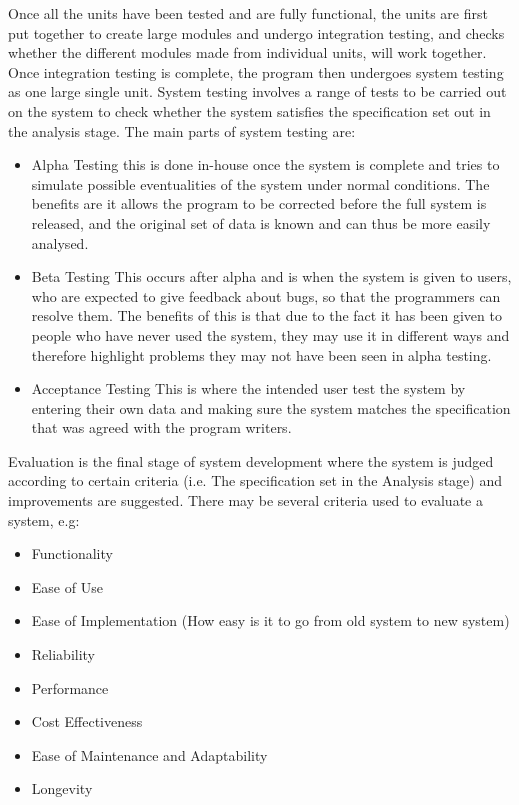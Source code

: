   Once all the units have been tested and are fully functional, the units are first put together to create large modules and  undergo integration testing, and checks whether the different modules made from individual units, will work together. Once integration testing is complete, the program then undergoes system testing as one large single unit. System testing involves a range of tests to be carried out on the system to check whether the system satisfies the specification set out in the analysis stage. The main parts of system testing are:
  \begin{itemize}
    \setlength\itemsep{0em}
    \item Alpha Testing
      \subitem this is done in-house once the system is complete and tries to simulate possible eventualities of the system under normal conditions. The benefits are it allows the program to be corrected before the full system is released, and the original set of data is known and can thus be more easily analysed.
    \item Beta Testing
      \subitem This occurs after alpha and is when the system is given to users, who are expected to give feedback about bugs, so that the programmers can resolve them. The benefits of this is that due to the fact it has been given to people who have never used the system, they may use it in different ways and therefore highlight problems they may not have been seen in alpha testing.
    \item Acceptance Testing
      \subitem This is where the intended user test the system by entering their own data and making sure the system matches the specification that was agreed with the program writers.
  \end{itemize}
  Evaluation is the final stage of system development where the system is judged according to certain criteria (i.e. The specification set in the Analysis stage) and improvements are suggested. There may be several criteria used to evaluate a system, e.g:
  \begin{itemize}
    \setlength{\itemsep}{0em}
    \item Functionality
    \item Ease of Use
    \item Ease of Implementation (How easy is it to go from old system to new system)
    \item Reliability
    \item Performance
    \item Cost Effectiveness
    \item Ease of Maintenance and Adaptability
    \item Longevity
  \end{itemize}
